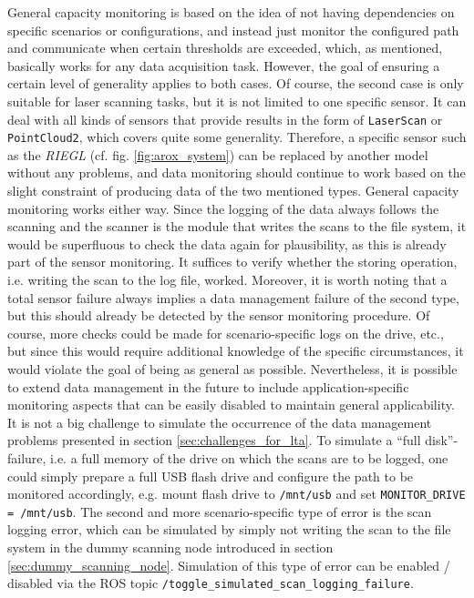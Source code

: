 \documentclass[english, master, utf8]{base/thesis_KBS}
\newcommand{\code}[1]{\colorbox{light-gray}{\texttt{#1}}}
\begin{document}
General capacity monitoring is based on the idea of not having dependencies on specific scenarios or configurations, and instead just monitor the configured path and communicate
when certain thresholds are exceeded, which, as mentioned, basically works for any data acquisition task. However, the goal of ensuring a certain level of generality applies to
both cases. Of course, the second case is only suitable for laser scanning tasks, but it is not limited to one specific sensor. It can deal with all kinds of sensors that provide
results in the form of \code{LaserScan} or \code{PointCloud2}, which covers quite some generality. Therefore, a specific sensor such as the \textit{RIEGL} (cf. fig.
\ref{fig:arox_system}) can be replaced by another model without any problems, and data monitoring should continue to work based on the slight constraint of producing data of the
two mentioned types. General capacity monitoring works either way. Since the logging of the data always follows the scanning and the scanner is the module that writes the scans to
the file system, it would be superfluous to check the data again for plausibility, as this is already part of the sensor monitoring. It suffices to verify whether the storing
operation, i.e. writing the scan to the log file, worked. Moreover, it is worth noting that a total sensor failure always implies a data management failure of the second type,
but this should already be detected by the sensor monitoring procedure. Of course, more checks could be made for scenario-specific logs on the drive, etc., but since this would
require additional knowledge of the specific circumstances, it would violate the goal of being as general as possible. Nevertheless, it is possible to extend data management in
the future to include application-specific monitoring aspects that can be easily disabled to maintain general applicability.\newline
It is not a big challenge to simulate the occurrence of the data management problems presented in section \ref{sec:challenges_for_lta}. To simulate a ``full disk''-failure,
i.e. a full memory of the drive on which the scans are to be logged, one could simply prepare a full USB flash drive and configure the path to be monitored accordingly,
e.g. mount flash drive to \code{/mnt/usb} and set \code{MONITOR\_DRIVE = /mnt/usb}. The second and more scenario-specific type of error is the scan logging error, which
can be simulated by simply not writing the scan to the file system in the dummy scanning node introduced in section \ref{sec:dummy_scanning_node}. Simulation of this type
of error can be enabled / disabled via the ROS topic \code{/toggle\_simulated\_scan\_logging\_failure}.\newline
\end{document}

